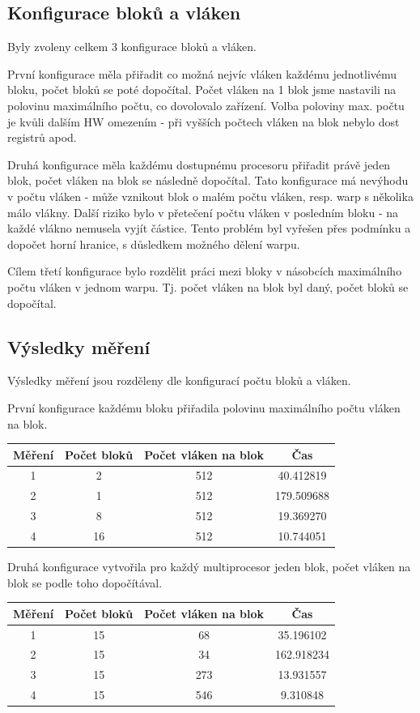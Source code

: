 \documentclass[12pt]{article}
\begin{document}
\subsection{Konfigurace bloků a vláken}
Byly zvoleny celkem 3 konfigurace bloků a vláken.

První konfigurace měla přiřadit co možná nejvíc vláken každému jednotlivému bloku, počet bloků se poté dopočítal.
Počet vláken na 1 blok jsme nastavili na polovinu maximálního počtu, co dovolovalo zařízení.
Volba poloviny max. počtu je kvůli dalším HW omezením - při vyšších počtech vláken na blok nebylo dost registrů apod.

Druhá konfigurace měla každému dostupnému procesoru přiřadit právě jeden blok, počet vláken na blok se následně dopočítal.
Tato konfigurace má nevýhodu v počtu vláken - může vznikout blok o malém počtu vláken, resp. warp s několika málo vlákny.
Další riziko bylo v přetečení počtu vláken v posledním bloku - na každé vlákno nemusela vyjít částice.
Tento problém byl vyřešen přes podmínku a dopočet horní hranice, s důsledkem možného dělení warpu.

Cílem třetí konfigurace bylo rozdělit práci mezi bloky v násobcích maximálního počtu vláken v jednom warpu.
Tj. počet vláken na blok byl daný, počet bloků se dopočítal.

\subsection{Výsledky měření}
Výsledky měření jsou rozděleny dle konfigurací počtu bloků a vláken.

První konfigurace každému bloku přiřadila polovinu maximálního počtu vláken na blok.
\begin{center}
\begin{tabular}{c | c | c | c}
\textbf{Měření} & \textbf{Počet bloků} & \textbf{Počet vláken na blok} & \textbf{Čas} \\ \hline \hline
1 & 2 & 512 & 40.412819 \\ \hline
2 & 1 & 512 & 179.509688 \\ \hline
3 & 8 & 512 & 19.369270 \\ \hline
4 & 16 & 512 & 10.744051 \\ \hline
\end{tabular}
\end{center}

Druhá konfigurace vytvořila pro každý multiprocesor jeden blok, počet vláken na blok se podle toho dopočítával.
\begin{center}
\begin{tabular}{c | c | c | c}
\textbf{Měření} & \textbf{Počet bloků} & \textbf{Počet vláken na blok} & \textbf{Čas} \\ \hline \hline
1 & 15 & 68 & 35.196102 \\ \hline
2 & 15 & 34 & 162.918234 \\ \hline
3 & 15 & 273 & 13.931557 \\ \hline
4 & 15 & 546 & 9.310848 \\ \hline
\end{tabular}
\end{center}
\end{document}
